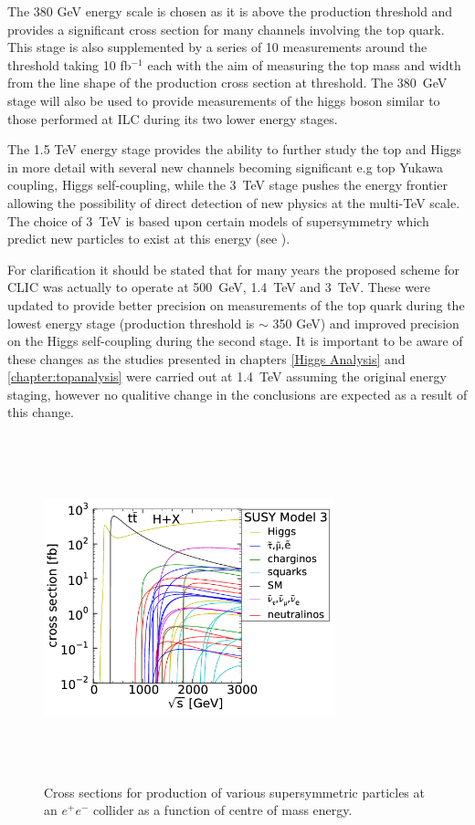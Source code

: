 The 380 GeV energy scale is chosen as it is above the \ttbar production threshold and provides a significant cross section for many channels involving the top quark. This stage is also supplemented by a series of 10 measurements around the \ttbar threshold taking 10 fb${^{-1}}$ each with the aim of measuring the top mass and width from the line shape of the \ttbar production cross section at threshold. The 380~GeV stage will also be used to provide measurements of the higgs boson similar to those performed at \ac{ILC} during its two lower energy stages.

The 1.5 TeV energy stage provides the ability to further study the top and Higgs in more detail with several new channels becoming significant e.g top Yukawa coupling, Higgs self-coupling, while the 3~TeV stage pushes the energy frontier allowing the possibility of direct detection of new physics at the multi-TeV scale. The choice of 3~TeV is based upon certain models of supersymmetry which predict new particles to exist at this energy (see ).

For clarification it should be stated that for many years the proposed scheme for CLIC was actually to operate at 500~GeV, 1.4~TeV and 3~TeV. These were updated to provide better precision on measurements of the top quark during the lowest energy stage (\ttbar production threshold is $\sim$ 350 GeV) and improved precision on the Higgs self-coupling during the second stage. It is important to be aware of these changes as the studies presented in chapters \ref{Higgs Analysis} and \ref{chapter:topanalysis} were carried out at 1.4~TeV assuming the original energy staging, however no qualitive change in the conclusions are expected as a result of this change.  

\begin{figure}
  \centering
  \includegraphics[width=0.75\textwidth,height=10cm,keepaspectratio]{Experiments/fig/clicSS}
  \caption[Cross Sections For Supersymmetric Processes at \ac{CLIC}]{Cross sections for production of various supersymmetric particles at an ${e^+e^-}$ collider as a function of centre of mass energy\cite{CDR}.}
  \label{Fig:SuperSym}
\end{figure}

